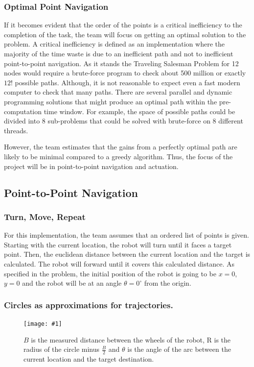 \documentclass[11pt,conference,onecolumn]{article} %
\newcommand{\myfigure}[4]{
  \begin{figure}[h!]
      \centering
      \texttt{[image: \#1]}
      \caption{#2}
\label{#4}
    \end{figure}
}
\begin{document}
\subsubsection*{Optimal Point Navigation}
If it becomes evident that the order of the points is a critical inefficiency to the completion of the task, the team will focus on getting an optimal solution to the problem. A critical inefficiency is defined as an implementation where the majority of the time waste is due to an inefficient path and not to inefficient point-to-point navigation. As it stands the Traveling Salesman Problem for 12 nodes would require a brute-force program to check about 500 million or exactly $12!$ possible paths. Although, it is not reasonable to expect even a fast modern computer to check that many paths. There are several parallel and dynamic programming solutions that might produce an optimal path within the pre-computation time window. For example, the space of possible paths could be divided into 8 sub-problems that could be solved with brute-force on 8 different threads.\par 
However, the team estimates that the gains from a perfectly optimal path are likely to be minimal compared to a greedy algorithm. Thus, the focus of the project will be in point-to-point navigation and actuation.


\subsection*{Point-to-Point Navigation}

\subsubsection*{Turn, Move, Repeat}
For this implementation, the team assumes that an ordered list of points is given. Starting with the current location, the robot will turn until it faces a target point. Then, the euclidean distance between the current location and the target is calculated. The robot will forward until it covers this calculated distance. As specified in the problem, the initial position of the robot is going to be $x=0$, $y=0$ and the robot will be at an angle $\theta=0^{\circ}$ from the origin.


\subsubsection*{Circles as approximations for trajectories.}
\myfigure{images/robotCircle.png}{$B$ is the measured distance between the wheels 
of the robot, R is the radius of the circle minus $\frac{B}{2}$ and $\theta$ is the angle of the arc between the current location and the target destination.}{0.5}{figure:robotCircle}
\end{document}
